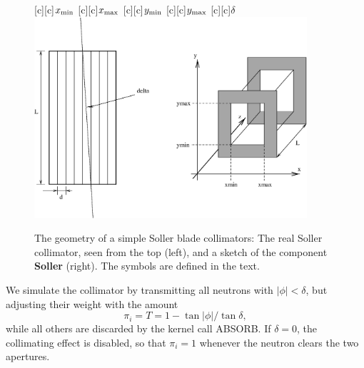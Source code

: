 \begin{figure}
  \begin{center}
    [c][c]{$x_{\rm min}$}
    [c][c]{$x_{\rm max}$}
    [c][c]{$y_{\rm min}$}
    [c][c]{$y_{\rm max}$}
    [c][c]{$\delta$}
    \includegraphics[width=0.9\textwidth]{figures/collimator.eps}
  \end{center}
\caption{The geometry of a simple Soller blade collimators:
The real Soller collimator, seen from the top (left), 
and a sketch of the component {\bf Soller} (right).
The symbols are defined in the text.}
\label{f:collimator}
\end{figure}

We simulate the collimator by transmitting all neutrons with
$|\phi| < \delta$, but adjusting their weight with the amount
\begin{equation}
\pi_i = T = 1-\tan|\phi|/ \tan\delta ,
\end{equation}
while all others are discarded by the kernel call ABSORB.
If $\delta=0$, the collimating effect is disabled,
so that $\pi_i = 1$ whenever the neutron clears the two apertures.

